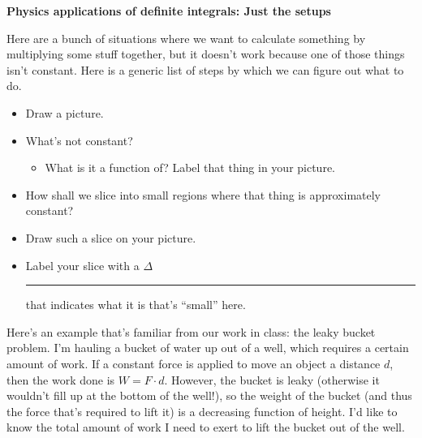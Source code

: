 \documentclass[12pt]{article}
\renewcommand{\section}[1]{\begin{center} \textbf{#1} \\\end{center}}
\begin{document}
%


\allowdisplaybreaks
\section{Physics applications of definite integrals: Just the setups}

Here are a bunch of situations where we want to calculate something by multiplying some stuff together, but it doesn't work because one of those things isn't constant.  Here is a generic list of steps by which we can figure out what to do.
\begin{itemize}[leftmargin=10pt]
    \item Draw a picture.
    \item What's not constant?
    \begin{itemize}
        \item What is it a function of? Label that thing in your picture.
    \end{itemize}
    \item How shall we slice into small regions where that thing is approximately constant?
    \item Draw such a slice on your picture.
    \item Label your slice with a \(\Delta\)\rule{0.5cm}{0.15mm} that indicates what it is that's ``small'' here.
\end{itemize}
Here's an example that's familiar from our work in class: the leaky bucket problem. I'm hauling a bucket of water up out of a well, which requires a certain amount of work. If a constant force is applied to move an object a distance \(d\), then the work done is \(W = F \cdot d\). However, the bucket is leaky (otherwise it wouldn't fill up at the bottom of the well!), so the weight of the bucket (and thus the force that's required to lift it) is a decreasing function of height. I'd like to know the total amount of work I need to exert to lift the bucket out of the well.
\end{document}
